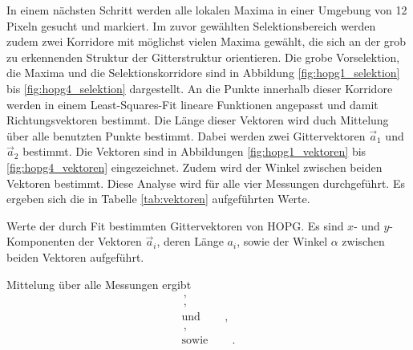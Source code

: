 In einem nächsten Schritt werden alle lokalen Maxima in einer Umgebung von
\num{12} Pixeln gesucht und markiert. Im zuvor gewählten Selektionsbereich
werden zudem zwei Korridore mit möglichst vielen Maxima gewählt, die sich an
der grob zu erkennenden Struktur der Gitterstruktur orientieren.
Die grobe Vorselektion, die Maxima und die Selektionskorridore sind in
Abbildung \ref{fig:hopg1_selektion} bis \ref{fig:hopg4_selektion} dargestellt.
An die Punkte innerhalb dieser Korridore werden in einem Least-Squares-Fit
lineare Funktionen angepasst und damit Richtungsvektoren bestimmt. Die Länge
dieser Vektoren wird duch Mittelung über alle benutzten Punkte bestimmt.
Dabei werden zwei Gittervektoren $\vec{a}_1$ und $\vec{a}_2$ bestimmt.
Die Vektoren sind in Abbildungen \ref{fig:hopg1_vektoren} bis
\ref{fig:hopg4_vektoren} eingezeichnet.
Zudem wird der Winkel zwischen beiden Vektoren bestimmt.
Diese Analyse wird für alle vier Messungen durchgeführt. Es ergeben sich die
in Tabelle \ref{tab:vektoren} aufgeführten Werte.
\begin{table}
    \centering
    \caption{
        Werte der durch Fit bestimmten Gittervektoren von HOPG. Es sind $x$-
        und $y$-Komponenten der Vektoren $\vec{a}_i$, deren Länge $a_i$, sowie
        der Winkel $\alpha$ zwischen beiden Vektoren aufgeführt.
    }
    \label{tab:vektoren}
    \begin{adjustbox}{center}
        
    \end{adjustbox}
\end{table}
Mittelung über alle Messungen ergibt
\begin{align*}
    \,,\\
    \,,\\
    \text{und}\qquad\,,\\
    \,,\\
    \text{sowie}\qquad\,.
\end{align*}

